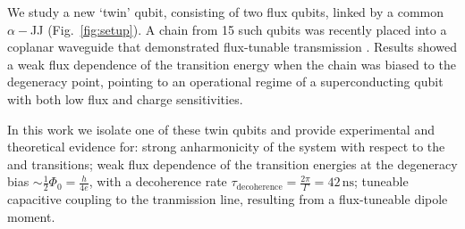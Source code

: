 We study a new `twin' qubit, consisting of two flux qubits, linked by a common $ \alpha-$JJ (Fig.~\ref{fig:setup}). A chain from 15 such
qubits was recently placed into a coplanar waveguide that demonstrated flux-tunable transmission \cite{shulga2018}. Results showed
a weak flux dependence of the transition energy when the chain was biased to the degeneracy point, pointing to an operational
regime of a superconducting qubit with both low flux and charge sensitivities.
 
In this work we isolate one of these twin qubits and provide experimental and theoretical evidence for: strong anharmonicity of
the system with respect to the \lra{} and \lra{} transitions; weak flux dependence of the transition
energies at the degeneracy bias $\sim \frac{1}{2}\Phi_0 = \frac{h}{4e}$, with a decoherence rate
$ \tau_\text{decoherence} = \frac{2\pi}{\Gamma}= 42\, \text{ns} $; tuneable capacitive coupling to the tranmission line, resulting from a
flux-tuneable dipole moment.